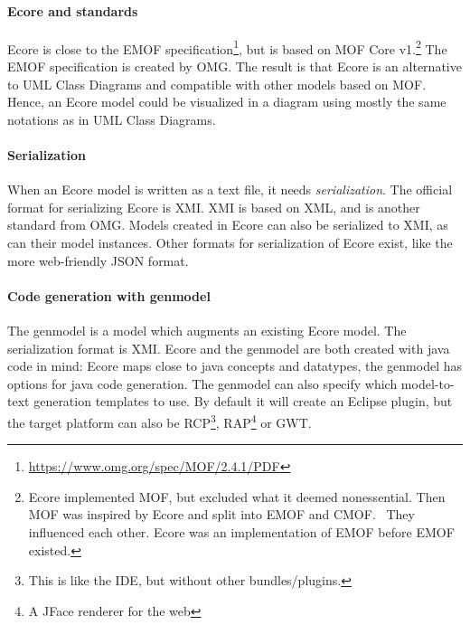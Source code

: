 \paragraph*{Ecore and standards}
\Gls{Ecore} is close to the \acrfull{EMOF} specification\footnote{\href{https://www.omg.org/spec/MOF/2.4.1/PDF}{https://www.omg.org/spec/MOF/2.4.1/PDF}}, but is based on MOF Core v1.\footnote{Ecore implemented MOF, but excluded what it deemed nonessential.
Then MOF was inspired by Ecore and split into \acrshort{EMOF} and CMOF.~\cite{merksMerksMeanderingsEMF2007} They influenced each other. 
Ecore was an implementation of \acrshort{EMOF} before \acrshort{EMOF} existed.}
The \acrshort{EMOF} specification is created by \acrfull{OMG}.
The result is that \gls{Ecore} is an alternative to \gls{UML} Class Diagrams and compatible with other models based on MOF.
Hence, an \gls{Ecore} model could be visualized in a diagram using mostly the same notations as in \gls{UML} Class Diagrams.

\paragraph*{Serialization} When an \gls{Ecore} model is written as a text file, it needs \textit{serialization}.
The official format for serializing Ecore is \acrfull{XMI}.
\Acrshort{XMI} is based on XML, and is another standard from \acrshort{OMG}.
Models created in \gls{Ecore} can also be serialized to \acrshort{XMI}, as can their model instances.
Other formats for serialization of \gls{Ecore} exist, like the more web-friendly \gls{JSON} format.


\paragraph*{Code generation with genmodel}
The genmodel is a model which augments an existing \gls{Ecore} model.
The serialization format is \acrshort{XMI}.
Ecore and the genmodel are both created with java code in mind: Ecore maps close to java concepts and datatypes, the genmodel has options for java code generation.
The genmodel can also specify which model-to-text generation templates to use.
By default it will create an \gls{Eclipse} plugin, but the target platform can also be \acrfull{RCP}\footnote{This is like the \acrshort{IDE}, but without other bundles/plugins.}, \acrfull{RAP}\footnote{A JFace renderer for the web} or \acrfull{GWT}.

